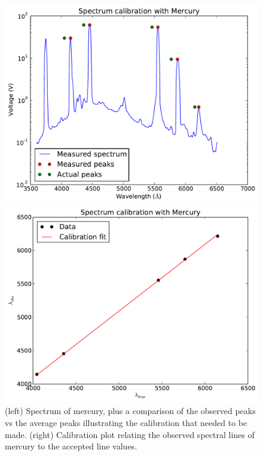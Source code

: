 \documentclass[11pt,letterpaper]{article}
\begin{document}
\begin{figure}
    \centering
    \begin{minipage}[t]{0.45\textwidth}
        \centering
        \includegraphics[width=\textwidth]{figures/merc_spec.pdf}
    \end{minipage}
    \hspace{0.5em}
    \begin{minipage}[t]{0.45\textwidth}
        \centering
        \includegraphics[width=\textwidth]{figures/merc_calib.pdf}
    \end{minipage}
    \caption{(left) Spectrum of mercury, plus a comparison of the observed peaks
    vs the average peaks illustrating the calibration that needed to be made.
    (right) Calibration plot relating the observed spectral lines of mercury to
    the accepted line values.}
    \label{mercury}
\end{figure}
\end{document}
